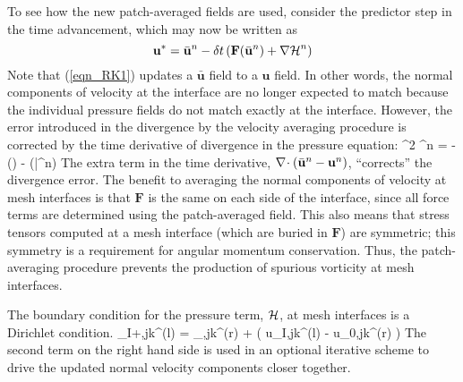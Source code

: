 To see how the new patch-averaged fields are used, consider the predictor step in the time advancement,
which may now be written as
\begin{equation}
\label{eqn_RK1}
\mathbf{u}^* = \bar{\mathbf{u}}^n - \delta t \left( \mathbf{F}(\bar{\mathbf{u}}^n) + {\nabla{\cal H}}^n \right)
\end{equation}
Note that (\ref{eqn_RK1}) updates a $\bar{\mathbf{u}}$ field to a $\mathbf{u}$ field. In other words, the normal components
of velocity at the interface are no longer expected to match because the individual pressure fields do not match exactly
at the interface. However, the error introduced in the divergence by the velocity averaging procedure is corrected by the time
derivative of divergence in the pressure equation:
\be
\label{eqn_poisson_stg1}
\nabla^2 {\cH}^n = -\left(\right) -
  (\bar{}^n)
\ee
The extra term in the time derivative, $\nabla\!\cdot (\bar{{\bf u}}^n - {\bf u}^n)$, ``corrects'' the divergence error.
The benefit to averaging the normal components of velocity at mesh interfaces is that $\mathbf{F}$ is the same on each side of the interface,
since all force terms are determined using the patch-averaged field.
This also means that stress tensors computed at a mesh interface (which are buried in $\mathbf{F}$) are symmetric;
this symmetry is a requirement for angular momentum conservation.  Thus, the patch-averaging procedure prevents the
production of spurious vorticity at mesh interfaces.

The boundary condition for the pressure term, $\cal H$, at mesh interfaces is a Dirichlet condition.
\be
   \cH_{I+\ha,jk}^{(l)} = \cH_{\ha,jk}^{(r)} \equiv {} +  ( u_{I,jk}^{(l)} - u_{0,jk}^{(r)} )
\ee
The second term on the right hand side is used in an optional iterative scheme to drive the updated normal velocity components closer together.

